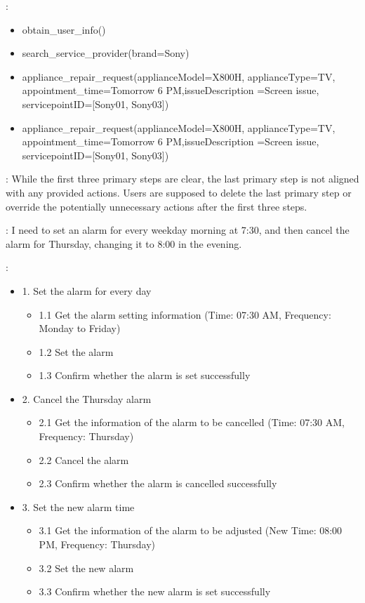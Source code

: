 :
\begin{itemize}
    \item obtain\_user\_info()
    \item search\_service\_provider(brand=Sony)
    \item appliance\_repair\_request(applianceModel=X800H, applianceType=TV, appointment\_time=Tomorrow 6 PM,issueDescription =Screen issue, servicepointID=[Sony01, Sony03])
    \item appliance\_repair\_request(applianceModel=X800H, applianceType=TV, appointment\_time=Tomorrow 6 PM,issueDescription =Screen issue, servicepointID=[Sony01, Sony03])
\end{itemize}

: While the first three primary steps are clear, the last primary step is not aligned with any provided actions. Users are supposed to delete the last primary step or override the potentially unnecessary actions after the first three steps.

: I need to set an alarm for every weekday morning at 7:30, and then cancel the alarm for Thursday, changing it to 8:00 in the evening.

:
\begin{itemize}
    \item 1. Set the alarm for every day
    \begin{itemize}
        \item 1.1 Get the alarm setting information (Time: 07:30 AM, Frequency: Monday to Friday)
        \item 1.2 Set the alarm
        \item 1.3 Confirm whether the alarm is set successfully
    \end{itemize}
    \item 2. Cancel the Thursday alarm
    \begin{itemize}
        \item 2.1 Get the information of the alarm to be cancelled (Time: 07:30 AM, Frequency: Thursday)
        \item 2.2 Cancel the alarm
        \item 2.3 Confirm whether the alarm is cancelled successfully
    \end{itemize}
    \item 3. Set the new alarm time
    \begin{itemize}
        \item 3.1 Get the information of the alarm to be adjusted (New Time: 08:00 PM, Frequency: Thursday)
        \item 3.2 Set the new alarm
        \item 3.3 Confirm whether the new alarm is set successfully
    \end{itemize}
\end{itemize}

